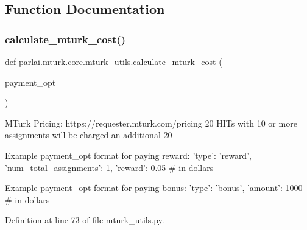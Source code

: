 \subsection{Function Documentation}
\mbox{\label{namespaceparlai_1_1mturk_1_1core_1_1mturk__utils_a4add40f6a463a3feb100a3c960ba3405}} 
\subsubsection{\texorpdfstring{calculate\+\_\+mturk\+\_\+cost()}{calculate\_mturk\_cost()}}
{\footnotesize\ttfamily def parlai.\+mturk.\+core.\+mturk\+\_\+utils.\+calculate\+\_\+mturk\+\_\+cost (\begin{DoxyParamCaption}\item[{}]{payment\+\_\+opt }\end{DoxyParamCaption})}

\begin{DoxyVerb}MTurk Pricing: https://requester.mturk.com/pricing
20%
HITs with 10 or more assignments will be charged an additional
20%

Example payment_opt format for paying reward:
{
    'type': 'reward',
    'num_total_assignments': 1,
    'reward': 0.05  # in dollars
}

Example payment_opt format for paying bonus:
{
    'type': 'bonus',
    'amount': 1000  # in dollars
}
\end{DoxyVerb}
 

Definition at line 73 of file mturk\+\_\+utils.\+py.

\mbox{\label{namespaceparlai_1_1mturk_1_1core_1_1mturk__utils_a68fb1962cbfa751d20f701da94ada62b}} 
